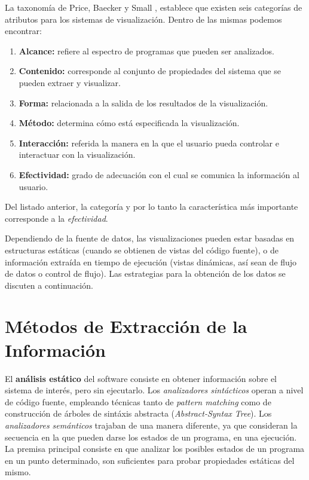 La taxonomía de Price, Baecker y Small \cite{PriceBaeckerSmallXX}, establece que
existen seis categorías de atributos para los sistemas de visualización.
Dentro de las mismas podemos encontrar:
\begin{enumerate}
    \item \textbf{Alcance:} refiere al espectro de programas que pueden ser analizados.
    \item \textbf{Contenido:} corresponde al conjunto de propiedades del sistema que se pueden
    extraer y visualizar.
    \item \textbf{Forma:} relacionada a la salida de los resultados de la visualización.
    \item \textbf{Método:} determina cómo está especificada la visualización.
    \item \textbf{Interacción:} referida la manera en la que el usuario pueda controlar e
    interactuar con la visualización.
    \item \textbf{Efectividad:} grado de adecuación con el cual se comunica la información
    al usuario.
\end{enumerate}
Del listado anterior, la categoría y por lo tanto la característica más importante corresponde
a la \textit{efectividad}.

Dependiendo de la fuente de datos, las visualizaciones pueden estar basadas en
estructuras estáticas (cuando se obtienen de vistas del código fuente), o de
información extraída en tiempo de ejecución (vistas dinámicas, así sean de flujo de datos
o control de flujo). \cite{PetreDeQuency06}
Las estrategias para la obtención de los datos se discuten a continuación.

\section{Métodos de Extracción de la Información}

El \textbf{análisis estático} del software consiste en obtener información sobre el 
sistema de interés, pero sin ejecutarlo.
Los \textit{analizadores sintácticos} operan a nivel de código fuente, empleando
técnicas tanto de \textit{pattern matching} como de construcción de árboles de sintáxis
abstracta (\textit{Abstract-Syntax Tree}).
Los \textit{analizadores semánticos} trajaban de una manera diferente, ya que consideran
la secuencia en la que pueden darse los estados de un programa, en una ejecución.
La premisa principal consiste en que analizar los posibles estados de un programa en un
punto determinado, son suficientes para probar propiedades estáticas del mismo.
\cite{Cousot77}

